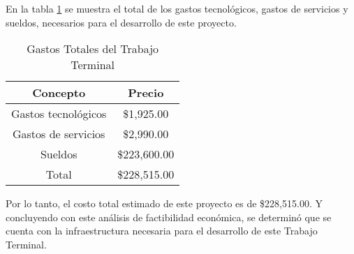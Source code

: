 En la tabla \ref{Gastostotales} se muestra el total de los gastos tecnológicos, gastos de servicios y sueldos, necesarios para el desarrollo de este proyecto.

\begin{table}[H]
	\centering
	\resizebox{10cm}{!} {
		\begin{tabular}{|c|c|}
			\hline
			Concepto & Precio \\ \hline
			Gastos tecnológicos & \$1,925.00 \\ \hline
			Gastos de servicios& \$2,990.00 \\ \hline
			Sueldos &  \$223,600.00 \\ \hline
			Total & \$228,515.00 \\ \hline
		\end{tabular}
	}
	\caption{Gastos Totales del Trabajo Terminal}
	\label{Gastostotales}
\end{table}

Por lo tanto, el costo total estimado de este proyecto es de \$228,515.00. Y concluyendo con este análisis de factibilidad económica, se determinó que se cuenta con la infraestructura necesaria para el desarrollo de este Trabajo Terminal.

 


